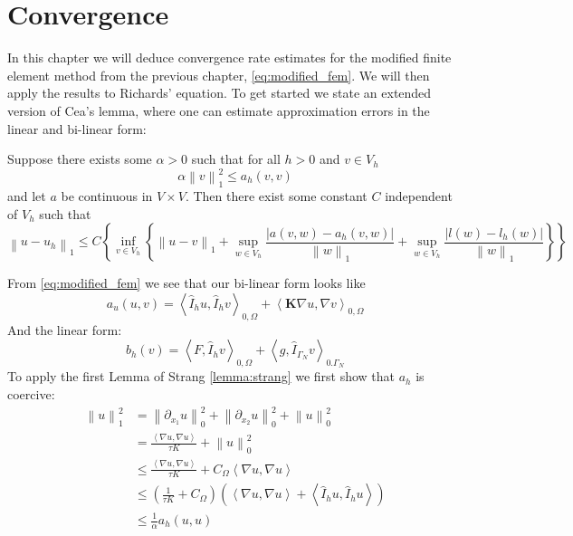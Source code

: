 \documentclass[../Main/main.tex]{subfiles}
\begin{document}
	\graphicspath{{../Convergence/figs/}}
	\chapter{Convergence}
	
	
	
	
	
	In this chapter we will deduce convergence rate estimates for the modified finite element method from the previous chapter, \eqref{eq:modified_fem}. We will then apply the results to Richards' equation. To get started we state an extended version of Cea's lemma, where one can estimate approximation errors in the linear and bi-linear form:

	\begin{lemma}\label{lemma:strang}
		Suppose there exists some $\alpha>0$ such that for all $h>0$ and $v\in V_h$
		\begin{equation*}
			\alpha \left \| v \right \|^2_1 \leq a_h(v,v) 
		\end{equation*}
		and let $a$ be continuous in $V\times V$. Then there exist some constant $C$ independent of $V_h$ such that
		\begin{equation}\label{eq:strang_ineq}
			\left \| u-u_h \right \|_1 \leq C\left \{ \inf_{v \in V_h}\left \{ \left \| u-v \right \|_1 + \sup_{w\in V_h}\frac{|a(v,w)-a_h(v,w)|}{\left \| w \right \|_1}+\sup_{w\in V_h}\frac{|l(w)-l_h(w)|}{\left \| w \right \|_1} \right \} \right \}
		\end{equation}
	\end{lemma}
	From \eqref{eq:modified_fem} we see that our bi-linear form looks like
	\begin{equation}
		a_u(u,v) = \left \langle \hat{I}_h u, \hat{I}_h v \right \rangle_{0,\Omega} +  \left \langle \pmb{K} \nabla u, \nabla v \right \rangle_{0,\Omega} 
	\end{equation}
	And the linear form:
	\begin{equation}
		b_h(v)= \left \langle F,\hat{I}_h v \right \rangle_{0,\Omega} + \left \langle g,\hat{I}_{\Gamma_N} v \right \rangle_{0.\Gamma_N}
	\end{equation}
	To apply the first Lemma of Strang \ref{lemma:strang} we first show that $a_h$ is coercive:
	\begin{equation}
		\begin{aligned}
			\left \| u \right \|_1^2 &= \left \| \partial_{x_1} u \right \|_0^2 + \left \| \partial_{x_2} u \right \|_0^2 + \left \| u \right \|_0^2 \\
			&= \frac{\left \langle \nabla u,\nabla u \right \rangle}{\tau K} + \left \| u \right \|_0^2 \\
			&\leq \frac{\left \langle \nabla u,\nabla u \right \rangle}{\tau K} + C_{\Omega} \left \langle \nabla u, \nabla u \right \rangle \\
			&\leq (\frac{1}{\tau K} + C_{\Omega})(\left \langle \nabla u, \nabla u \right \rangle + \left \langle \hat{I}_h u, \hat{I}_h u \right \rangle)\\
			&\leq \frac{1}{\alpha} a_h(u,u) 
		\end{aligned}
	\end{equation} 
\end{document}
